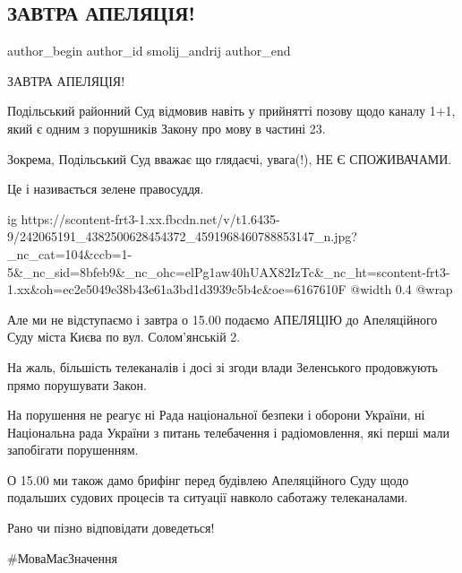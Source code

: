  
 
 
 
 
 
\subsection{ЗАВТРА АПЕЛЯЦІЯ!}
\label{sec:14_09_2021.fb.smolij_andrij.1.apeljacia_zakon_mova_tv}
 
\ifcmt
 author_begin
   author_id smolij_andrij
 author_end
\fi

ЗАВТРА АПЕЛЯЦІЯ! 

Подільський районний Суд відмовив навіть у прийнятті позову щодо каналу 1+1,
який є одним з порушників Закону про мову в частині 23. 

Зокрема, Подільський Суд вважає що глядаєчі, увага(!), НЕ Є СПОЖИВАЧАМИ.

Це і називається зелене правосуддя.

\ifcmt
  ig https://scontent-frt3-1.xx.fbcdn.net/v/t1.6435-9/242065191_4382500628454372_4591968460788853147_n.jpg?_nc_cat=104&ccb=1-5&_nc_sid=8bfeb9&_nc_ohc=elPg1aw40hUAX82IzTc&_nc_ht=scontent-frt3-1.xx&oh=ec2e5049e38b43e61a3bd1d3939c5b4c&oe=6167610F
  @width 0.4
  @wrap 
\fi

Але ми не відступаємо і завтра о 15.00 подаємо АПЕЛЯЦІЮ до Апеляційного Суду
міста Києва по вул. Солом’янській 2. 

На жаль, більшість телеканалів і досі зі згоди влади Зеленського продовжують
прямо порушувати Закон. 

На порушення не реагує ні Рада національної безпеки і оборони України, ні
Національна рада України з питань телебачення і радіомовлення, які перші мали
запобігати порушенням. 

О 15.00 ми також дамо брифінг перед будівлею Апеляційного Суду щодо подальших
судових процесів та ситуації навколо саботажу телеканалами. 

Рано чи пізно відповідати доведеться! 

\#МоваМаєЗначення

